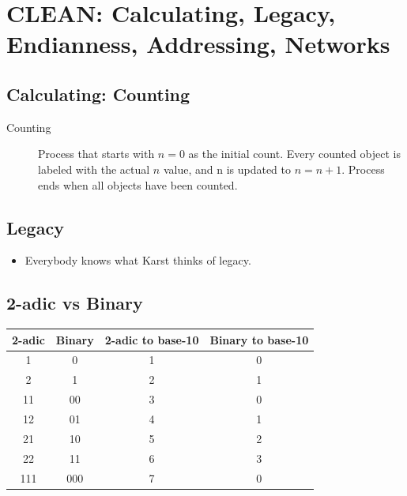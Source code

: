 \documentclass{article}
\begin{document}
\newpage







\section{CLEAN: Calculating, Legacy, Endianness, Addressing, Networks}

\subsection{Calculating: Counting}

\begin{description}
	\item[Counting] Process that starts with $n=0$ as the initial count. Every counted object is labeled with the actual $n$ value, and n is updated to $n=n+1$. Process ends when all objects have been counted.
\end{description}
	
	
\subsection{Legacy}

\begin{itemize}
	\item Everybody knows what Karst thinks of legacy.
\end{itemize}


\subsection{2-adic vs Binary}

\begin{center}
  \begin{tabular}{ | c | c | c | c | }
    2-adic & Binary & 2-adic to base-10 & Binary to base-10 \\ \hline
    1 & 0 & 1 & 0 \\ \hline
    2 & 1 & 2 & 1 \\ \hline
    11 & 00 & 3 & 0 \\ \hline
    12 & 01 & 4 & 1 \\ \hline
    21 & 10 & 5 & 2 \\ \hline
    22 & 11 & 6 & 3 \\ \hline
    111 & 000 & 7 & 0 \\ 
    \hline
  \end{tabular}
\end{center}
\end{document}
